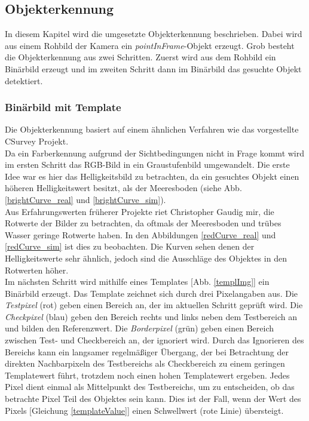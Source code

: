 \subsection{Objekterkennung}
\label{sec_objDet}
In diesem Kapitel wird die umgesetzte Objekterkennung beschrieben. Dabei wird aus einem Rohbild der Kamera ein \textit{pointInFrame}-Objekt erzeugt. Grob besteht die Objekterkennung aus zwei Schritten. Zuerst wird aus dem Rohbild ein Binärbild erzeugt und im zweiten Schritt dann im Binärbild das gesuchte Objekt detektiert.
\subsubsection{Binärbild mit Template}
\label{sec_templ}
Die Objekterkennung basiert auf einem ähnlichen Verfahren wie das vorgestellte CSurvey Projekt\cite{Albiez2015CSurveyA}.\\
Da ein Farberkennung aufgrund der Sichtbedingungen nicht in Frage kommt wird im ersten Schritt das RGB-Bild in ein Graustufenbild umgewandelt. Die erste Idee war es hier das Helligkeitsbild zu betrachten, da ein gesuchtes Objekt einen höheren Helligkeitswert besitzt, als der Meeresboden (siehe Abb. \ref{brightCurve_real} und \ref{brightCurve_sim}).\\
Aus Erfahrungswerten früherer Projekte riet Christopher Gaudig mir, die Rotwerte der Bilder zu betrachten, da oftmals der Meeresboden und trübes Wasser geringe Rotwerte haben. In den Abbildungen \ref{redCurve_real} und \ref{redCurve_sim} ist dies zu beobachten. Die Kurven sehen denen der Helligkeitswerte sehr ähnlich, jedoch sind die Ausschläge des Objektes in den Rotwerten höher.\\
Im nächsten Schritt wird mithilfe eines Templates [Abb. \ref{templImg}] ein Binärbild erzeugt. Das Template zeichnet sich durch drei Pixelangaben aus. Die \textit{Testpixel} (rot) geben einen Bereich an, der im aktuellen Schritt geprüft wird. Die \textit{Checkpixel} (blau) geben den Bereich rechts und links neben dem Testbereich an und bilden den Referenzwert. Die \textit{Borderpixel} (grün) geben einen Bereich zwischen Test- und Checkbereich an, der ignoriert wird. Durch das Ignorieren des Bereichs kann ein langsamer regelmäßiger Übergang, der bei Betrachtung der direkten Nachbarpixeln des Testbereichs als Checkbereich zu einem geringen Templatewert führt, trotzdem noch einen hohen Templatewert ergeben. Jedes Pixel dient einmal als Mittelpunkt des Testbereichs, um zu entscheiden, ob das betrachte Pixel Teil des Objektes sein kann. Dies ist der Fall, wenn der Wert des Pixels [Gleichung \ref{templateValue}] einen Schwellwert (rote Linie) übersteigt.\\
